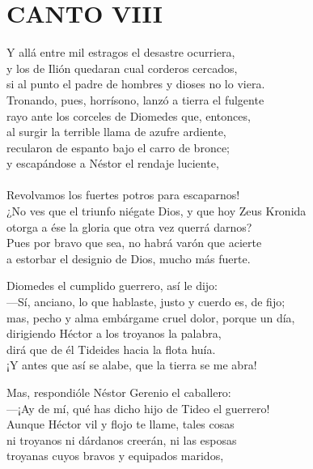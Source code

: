 \bnum
\section*{\centering CANTO VIII}
%
\separator
\postart
{}
Y allá entre mil estragos el desastre ocurriera,\\
y los de Ilión quedaran cual corderos cercados,\\
si al punto el padre de hombres y dioses no lo viera.\\
Tronando, pues, horrísono, lanzó a tierra el fulgente\\
rayo ante los corceles de Diomedes que, entonces,\\
al surgir la terrible llama de azufre ardiente,\\
recularon de espanto bajo el carro de bronce;\\
y escapándose a Néstor el rendaje luciente,\\
\\
Revolvamos los fuertes potros para escaparnos!\\
¿No ves que el triunfo niégate Dios, y que hoy Zeus Kronida\\
otorga a ése la gloria que otra vez querrá darnos?\\
Pues por bravo que sea, no habrá varón que acierte\\
a estorbar el designio de Dios, mucho más fuerte.\par
Diomedes el cumplido guerrero, así le dijo:\\
---Sí, anciano, lo que hablaste, justo y cuerdo es, de fijo;\\
mas, pecho y alma embárgame cruel dolor, porque un día,\\
dirigiendo Héctor a los troyanos la palabra,\\
dirá que de él Tideides hacia la flota huía.\\
¡Y antes que así se alabe, que la tierra se me abra!\par
Mas, respondióle Néstor Gerenio el caballero:\\
---¡Ay de mí, qué has dicho hijo de Tideo el guerrero!\\
Aunque Héctor vil y flojo te llame, tales cosas\\
ni troyanos ni dárdanos creerán, ni las esposas\\
troyanas cuyos bravos y equipados maridos,\\
